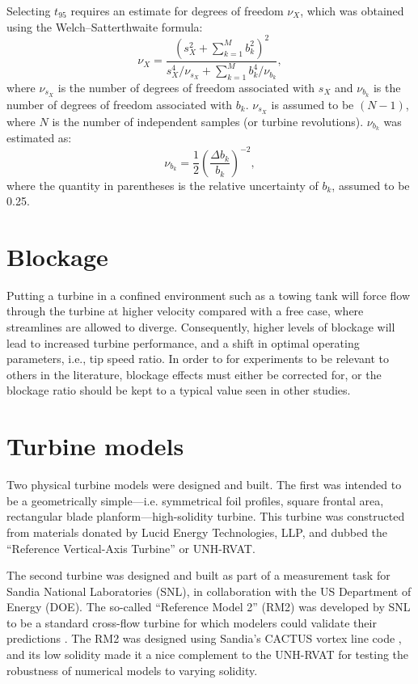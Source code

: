 Selecting $t_{95}$ requires an estimate for degrees of freedom $\nu_X$, which
was obtained using the Welch--Satterthwaite formula:
\begin{equation}
\nu_X = \frac{\left(s_X^2 + \sum_{k=1}^M b_k^2 \right)^2} {s_X^4/\nu_{s_X} +
    \sum_{k=1}^M b_k^4/\nu_{b_k}},
\end{equation}
where $\nu_{s_X}$ is the number of degrees of freedom associated with $s_X$ and
$\nu_{b_k}$ is the number of degrees of freedom associated with $b_k$.
$\nu_{s_X}$ is assumed to be $(N-1)$, where $N$ is the number of independent
samples (or turbine revolutions). $\nu_{b_k}$ was estimated as:
\begin{equation}
\nu_{b_k} = \frac{1}{2} \left( \frac{\Delta b_k}{b_k} \right)^{-2},
\end{equation}
where the quantity in parentheses is the relative uncertainty of $b_k$, assumed
to be 0.25.




\section{Blockage}

Putting a turbine in a confined environment such as a towing tank will force
flow through the turbine at higher velocity compared with a free case, where
streamlines are allowed to diverge. Consequently, higher levels of blockage will
lead to increased turbine performance, and a shift in optimal operating
parameters, i.e., tip speed ratio. In order to for experiments to be relevant to
others in the literature, blockage effects must either be corrected for, or the
blockage ratio should be kept to a typical value seen in other studies.


\section{Turbine models}

Two physical turbine models were designed and built. The first was intended to
be a geometrically simple---i.e. symmetrical foil profiles, square frontal area,
rectangular blade planform---high-solidity turbine. This turbine was constructed
from materials donated by Lucid Energy Technologies, LLP, and dubbed the
``Reference Vertical-Axis Turbine'' or UNH-RVAT.

The second turbine was designed and built as part of a measurement task for
Sandia National Laboratories (SNL), in collaboration with the US Department of
Energy (DOE). The so-called ``Reference Model 2'' (RM2) was developed by SNL to
be a standard cross-flow turbine for which modelers could validate their
predictions \cite{Neary2014}. The RM2 was designed using Sandia's CACTUS vortex
line code \cite{Barone2011}, and its low solidity made it a nice complement to
the UNH-RVAT for testing the robustness of numerical models to varying solidity.


